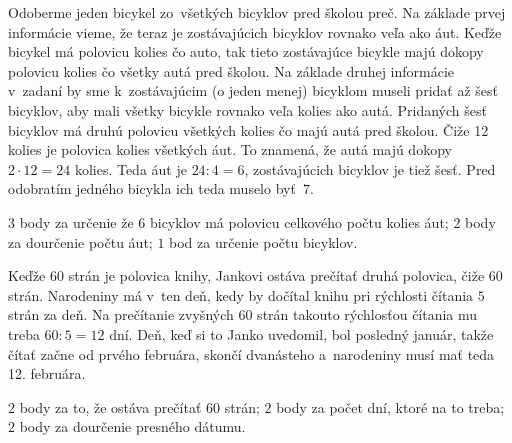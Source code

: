 {%
Odoberme jeden bicykel zo~všetkých bicyklov pred školou preč. Na základe prvej informácie vieme,
že teraz je zostávajúcich bicyklov rovnako veľa ako áut. Keďže bicykel má polovicu kolies čo auto, tak
tieto zostávajúce bicykle majú dokopy polovicu kolies čo všetky autá pred školou. Na základe druhej
informácie v~zadaní by sme k~zostávajúcim (o jeden menej) bicyklom museli pridať až šesť bicyklov, aby
mali všetky bicykle rovnako veľa kolies ako autá. Pridaných šesť bicyklov má druhú polovicu všetkých
kolies čo majú autá pred školou. Čiže 12 kolies je polovica kolies všetkých áut. To znamená, že autá majú
dokopy $2\cdot12=24$ kolies. Teda áut je $24:4=6$, zostávajúcich bicyklov je tiež šesť. Pred odobratím
jedného bicykla ich teda muselo byť~$7$.


\hodnotenie
$3$ body za určenie že $6$ bicyklov má polovicu celkového počtu kolies áut; $2$ body za dourčenie počtu áut; $1$ bod za určenie počtu bicyklov.
\endhodnotenie
}

{%
Keďže $60$ strán je polovica knihy, Jankovi ostáva prečítať druhá polovica, čiže $60$ strán. Narodeniny má v~ten deň, kedy by dočítal knihu pri rýchlosti čítania $5$ strán za deň. Na prečítanie zvyšných $60$ strán takouto rýchlosťou čítania mu treba $60:5=12$ dní. Deň, keď si to Janko uvedomil, bol posledný január, takže čítať začne od prvého februára, skončí dvanásteho a~narodeniny musí mať teda 12. februára.

\hodnotenie
$2$ body za to, že ostáva prečítať $60$ strán; $2$ body za počet dní, ktoré na to treba; $2$ body za dourčenie presného dátumu.
\endhodnotenie
}

